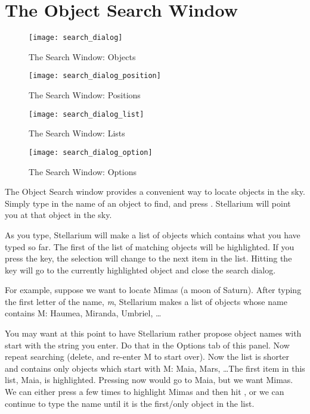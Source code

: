 \section{The Object Search Window}
\label{sec:gui:search}

\begin{figure}[p]
\centering\texttt{[image: search\_dialog]}
\caption{The Search Window: Objects}
\label{fig:gui:search}
\end{figure}

\begin{figure}[p]
\centering\texttt{[image: search\_dialog\_position]}
\caption{The Search Window: Positions}
\label{fig:gui:search:position}
\end{figure}

\begin{figure}[p]
\centering\texttt{[image: search\_dialog\_list]}
\caption{The Search Window: Lists}
\label{fig:gui:search:lists}
\end{figure}


\begin{figure}[tp]
\centering\texttt{[image: search\_dialog\_option]}
\caption{The Search Window: Options}
\label{fig:gui:search:options}
\end{figure}

The Object Search window provides a convenient way to locate objects
in the sky. Simply type in the name of an object to find, and press
\key{\return}. Stellarium will point you at that object in the sky.

As you type, Stellarium will make a list of objects which contains 
what you have typed so far. The first of the list of matching objects
will be highlighted. If you press the \key{\tab} key, the selection will change
to the next item in the list. Hitting the \key{\return} key will go to the
currently highlighted object and close the search dialog.

For example, suppose we want to locate Mimas (a moon of Saturn). After
typing the first letter of the name, \emph{m}, Stellarium makes a list
of objects whose name contains M: Haumea, Miranda, Umbriel, \ldots 

You may want at this point to have Stellarium rather propose object
names with start with the string you enter. Do that in the Options tab
of this panel. Now repeat searching (delete, and re-enter M to start
over). Now the list is shorter and contains only objects which start
with M: Maia, Mars, \ldots The first item in this list, Maia, is
highlighted. Pressing \key{\return} now would go to Maia, but we want
Mimas. We can either press \key{\tab} a few times to highlight Mimas
and then hit \key{\return}, or we can continue to type the name until
it is the first/only object in the list.

